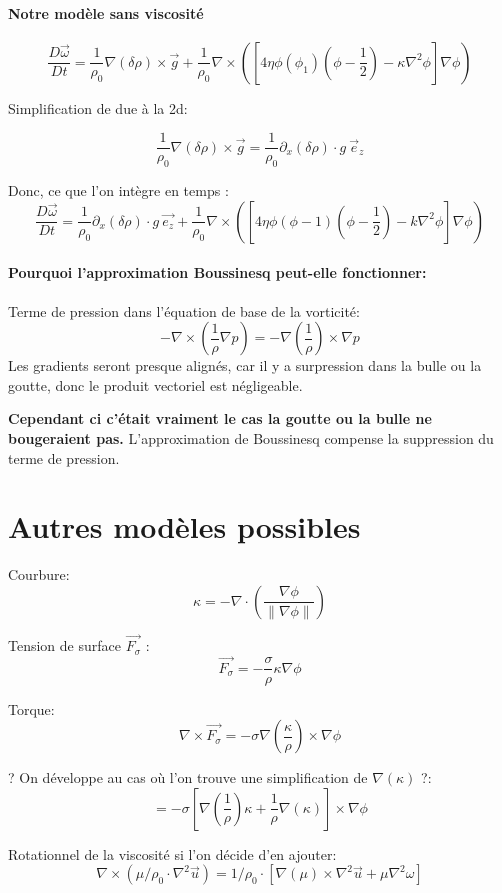 \documentclass[10pt,a4paper]{article}
\begin{document}
\paragraph{Notre modèle sans viscosité }

\[
	\dfrac{D \vec{\omega}}{D t} = \dfrac{1}{\rho_0} \nabla (\delta \rho) \times \vec{g} + \dfrac{1}{\rho_0} \nabla \times \left( \left[ 4 \eta \phi (\phi_1) \left(\phi - \dfrac{1}{2}\right) - \kappa \nabla^2 \phi \right] \nabla \phi \right)
\]

Simplification de  due à la 2d: 

\[  \dfrac{1}{\rho_0} \nabla (\delta \rho) \times \vec{g} = \dfrac{1}{\rho_0} \partial_x (\delta \rho) \cdot g~\vec{e}_z \]


Donc, ce que l'on intègre en temps :
\[
	\dfrac{D \vec{\omega}}{D t} = \dfrac{1}{\rho_0} \partial_x (\delta \rho ) \cdot g ~\vec{e_z} + \dfrac{1}{\rho_0} \nabla \times \left( \left[ 4 \eta \phi (\phi - 1) \left(\phi - \dfrac{1}{2} \right) - k\nabla^2 \phi \right] \nabla \phi\right)
\]

\paragraph{Pourquoi l'approximation Boussinesq peut-elle fonctionner:}

Terme de pression dans l'équation de base de la vorticité:
\[ -\nabla \times \left( \frac{1}{\rho} \nabla p \right) = -\nabla \left( \frac{1}{\rho} \right) \times \nabla p \] 
Les gradients seront presque alignés, car il y a surpression dans la bulle ou la goutte, donc le produit vectoriel est négligeable.

\textbf{Cependant ci c'était vraiment le cas la goutte ou la bulle ne bougeraient pas.} L'approximation de Boussinesq 
 compense la suppression du terme de pression.
\section{Autres modèles possibles}



Courbure:
\[ \kappa = - \nabla \cdot \left( \frac{\nabla\phi}{\left\| \nabla \phi \right\|} \right) \] 

Tension de surface $\vec{F_{\sigma}}$ :
\[ \vec{F_{\sigma}}= - \frac{\sigma}{\rho} \kappa \nabla \phi \]

Torque:
\[ \nabla \times \vec{F_{\sigma}} = - \sigma\nabla\left( \frac{\kappa}{\rho}\right)\times \nabla \phi \]

? On développe au cas où l'on trouve une simplification de $\nabla(\kappa)$ ?:
\[ =-\sigma \left[ \nabla\left( \frac{1}{\rho}\right)\kappa + \frac{1}{\rho} \nabla(\kappa) \right]\times \nabla\phi \]

Rotationnel de la viscosité si l'on décide d'en ajouter:
\[
\nabla\times (\mu/\rho_0\cdot\nabla^2\vec{u}) = 1/\rho_0 \cdot \left[ \nabla(\mu) \times \nabla^2\vec{u} + \mu \nabla^2\omega \right]
\]
\end{document}
